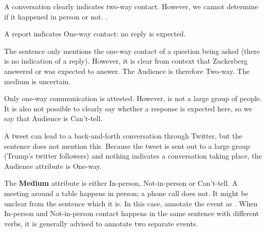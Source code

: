 \begin{exe}
    
    \ex {} 
        \expl A conversation clearly indicates two-way contact. However, we cannot determine if it happened in person or not.
        .
        
    \ex {} 
        \expl A report indicates One-way contact: no reply is expected. 
        
    \ex {} 
        \expl The sentence only mentions the one-way contact of a question being asked (there is no indication of a reply). However, it is clear from context that Zuckerberg answered or was expected to answer. The Audience is therefore Two-way. The medium is uncertain. 
        
    \ex {} 
        \expl Only one-way communication is attested. However,  is not a large group of people. It is also not possible to clearly say whether a response is expected here, so we say that Audience is Can't-tell. 
        
    \ex {} 
        \expl A tweet can lead to a back-and-forth conversation through Twitter, but the sentence does not mention this. Because the tweet is sent out to a large group (Trump's twitter followers) and nothing indicates a conversation taking place, the Audience attribute is One-way. 
    
\end{exe}

The \textbf{Medium} attribute is either In-person, Not-in-person or Can't-tell. A meeting around a table happens in person; a phone call does not. It might be unclear from the sentence which it is. In this case, annotate the event as . When In-person and Not-in-person contact happens in the same sentence with different verbs, it is generally advised to annotate two separate events.

